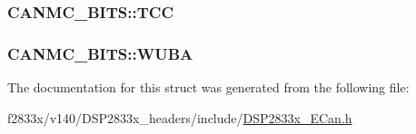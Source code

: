 \subsubsection[{T\+C\+C}]{ C\+A\+N\+M\+C\+\_\+\+B\+I\+T\+S\+::\+T\+C\+C}\label{struct_c_a_n_m_c___b_i_t_s_a975a19b7f19a593ac6c15fc53a9646e4}
\hypertarget{struct_c_a_n_m_c___b_i_t_s_a73c0e2436b9618b80afcf9826b5ccffb}{}
\subsubsection[{W\+U\+B\+A}]{ C\+A\+N\+M\+C\+\_\+\+B\+I\+T\+S\+::\+W\+U\+B\+A}\label{struct_c_a_n_m_c___b_i_t_s_a73c0e2436b9618b80afcf9826b5ccffb}


The documentation for this struct was generated from the following file\+:\begin{DoxyCompactItemize}
\item 
f2833x/v140/\+D\+S\+P2833x\+\_\+headers/include/\hyperlink{_d_s_p2833x___e_can_8h}{D\+S\+P2833x\+\_\+\+E\+Can.\+h}\end{DoxyCompactItemize}
